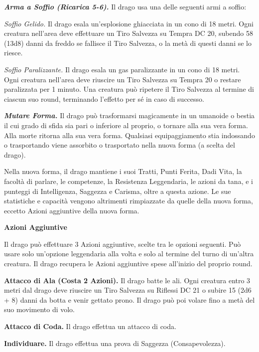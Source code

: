 \begin{multicols}{2}
	\textit{\textbf{Arma a Soffio (Ricarica 5-6).}} Il drago usa una delle seguenti armi a soffio:

	\textit{Soffio Gelido.} Il drago esala un'esplosione ghiacciata in un cono di 18 metri. Ogni creatura nell'area deve effettuare un Tiro Salvezza su Tempra DC 20, subendo 58 (13d8) danni da freddo se fallisce il Tiro Salvezza, o la metà di questi danni se lo riesce.

	\textit{Soffio Paralizzante.} Il drago esala un gas paralizzante in un cono di 18 metri. Ogni creatura nell'area deve riuscire un Tiro Salvezza su Tempra 20 o restare paralizzata per 1 minuto. Una creatura può ripetere il Tiro Salvezza al termine di ciascun suo round, terminando l'effetto per sé in caso di successo.

	\textit{\textbf{Mutare Forma.}} Il drago può trasformarsi magicamente in un umanoide o bestia il cui grado di sfida sia pari o inferiore al proprio, o tornare alla sua vera forma. Alla morte ritorna alla sua vera forma. Qualsiasi equipaggiamento stia indossando o trasportando viene assorbito o trasportato nella nuova forma (a scelta del drago).

	Nella nuova forma, il drago mantiene i suoi Tratti, Punti Ferita, Dadi Vita, la facoltà di parlare, le competenze, la Resistenza Leggendaria, le azioni da tana, e i punteggi di Intelligenza, Saggezza e Carisma, oltre a questa azione. Le sue statistiche e capacità vengono altrimenti rimpiazzate da quelle della nuova forma, eccetto Azioni aggiuntive della nuova forma.

	\textbf{Azioni Aggiuntive}

	Il drago può effettuare 3 Azioni aggiuntive, scelte tra le opzioni seguenti. Può usare solo un'opzione leggendaria alla volta e solo al termine del turno di un'altra creatura. Il drago recupera le Azioni aggiuntive spese all'inizio del proprio round.

	\textbf{Attacco di Ala (Costa 2 Azioni).} Il drago batte le ali. Ogni creatura entro 3 metri dal drago deve riuscire un Tiro Salvezza su Riflessi DC 21 o subire 15 (2d6 + 8) danni da botta e venir gettato prono. Il drago può poi volare fino a metà del suo movimento di volo.

	\textbf{Attacco di Coda.} Il drago effettua un attacco di coda.

	\textbf{Individuare.} Il drago effettua una prova di Saggezza (Consapevolezza).


\end{multicols}
